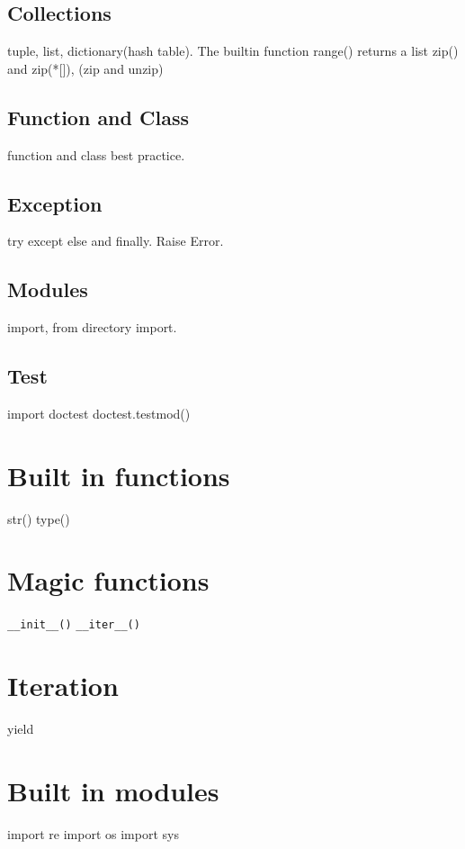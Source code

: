 \subsection{Collections}
tuple, list, dictionary(hash table). 
The builtin function range() returns a list
zip() and zip(*[]), (zip and unzip)

\subsection{Function and Class}
function and class best practice.   

\subsection{Exception}
try except else and finally. Raise Error.   

\subsection{Modules}
import, from directory import.  

\subsection{Test}
import doctest
    doctest.testmod()

\section{Built in functions}
str()
type()

\section{Magic functions}
\verb/__init__()/
\verb/__iter__()/

\section{Iteration}
yield

\section{Built in modules}
import re
import os
import sys





